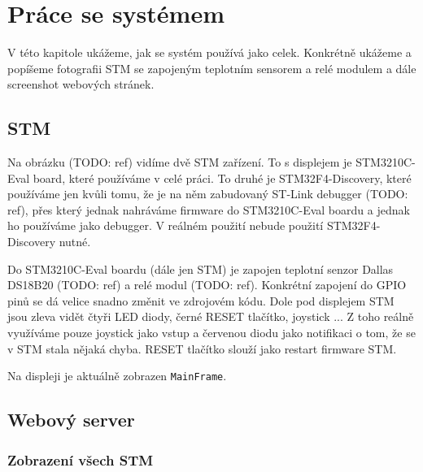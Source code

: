 
\section{Práce se systémem}
V této kapitole ukážeme, jak se systém používá jako celek.
Konkrétně ukážeme a popíšeme fotografii STM se zapojeným teplotním sensorem a relé modulem a dále
screenshot webových stránek.

\subsection{STM}


Na obrázku (TODO: ref) vidíme dvě STM zařízení.
To s displejem je STM3210C-Eval board, které používáme v celé práci.
To druhé je STM32F4-Discovery, které používáme jen kvůli tomu, že je na něm zabudovaný ST-Link
debugger (TODO: ref), přes který jednak nahráváme firmware do STM3210C-Eval boardu a jednak
ho používáme jako debugger.
V reálném použití nebude použití STM32F4-Discovery nutné.

Do STM3210C-Eval boardu (dále jen STM) je zapojen teplotní senzor Dallas DS18B20 (TODO: ref)
a relé modul (TODO: ref).
Konkrétní zapojení do GPIO pinů se dá velice snadno změnit ve zdrojovém kódu.
Dole pod displejem STM jsou zleva vidět čtyři LED diody, černé RESET tlačítko, joystick ...
Z toho reálně využíváme pouze joystick jako vstup a červenou diodu jako notifikaci o tom, že
se v STM stala nějaká chyba.
RESET tlačítko slouží jako restart firmware STM.

Na displeji je aktuálně zobrazen \texttt{MainFrame}.


\subsection{Webový server}

\subsubsection{Zobrazení všech STM}

